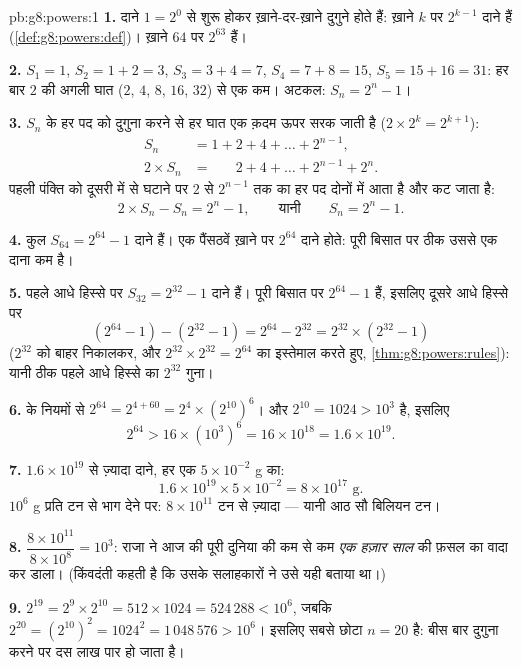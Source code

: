 \begin{solution}{pb:g8:powers:1}
\textbf{1.} दाने $1 = 2^0$ से शुरू होकर ख़ाने-दर-ख़ाने दुगुने होते
हैं: ख़ाने $k$ पर $2^{k-1}$ दाने हैं
(\cref{def:g8:powers:def})। ख़ाने $64$ पर $2^{63}$ हैं।

\textbf{2.} $S_1 = 1$, $S_2 = 1 + 2 = 3$, $S_3 = 3 + 4 = 7$,
$S_4 = 7 + 8 = 15$, $S_5 = 15 + 16 = 31$: हर बार $2$ की अगली घात
($2$, $4$, $8$, $16$, $32$) से एक कम। अटकल:
$S_n = 2^n - 1$।

\textbf{3.} $S_n$ के हर पद को दुगुना करने से हर घात एक क़दम ऊपर
सरक जाती है ($2 \times 2^{k} = 2^{k+1}$):
\begin{align*}
S_n &= 1 + 2 + 4 + \dots + 2^{n-1}, \\
2 \times S_n &= \phantom{1 + {}} 2 + 4 + \dots + 2^{n-1} + 2^n .
\end{align*}
पहली पंक्ति को दूसरी में से घटाने पर $2$ से $2^{n-1}$ तक का हर पद
दोनों में आता है और कट जाता है:
\[
2 \times S_n - S_n = 2^n - 1,
\qquad\text{यानी}\qquad
S_n = 2^n - 1 .
\]

\textbf{4.} कुल $S_{64} = 2^{64} - 1$ दाने हैं। एक पैंसठवें ख़ाने
पर $2^{64}$ दाने होते: पूरी बिसात पर ठीक उससे एक दाना कम है।

\textbf{5.} पहले आधे हिस्से पर $S_{32} = 2^{32} - 1$ दाने हैं।
पूरी बिसात पर $2^{64} - 1$ हैं, इसलिए दूसरे आधे हिस्से पर
\[
\left(2^{64} - 1\right) - \left(2^{32} - 1\right)
= 2^{64} - 2^{32}
= 2^{32} \times \left(2^{32} - 1\right)
\]
($2^{32}$ को बाहर निकालकर, और $2^{32} \times 2^{32} = 2^{64}$ का
इस्तेमाल करते हुए, \cref{thm:g8:powers:rules}): यानी ठीक पहले आधे
हिस्से का $2^{32}$ गुना।

\textbf{6.}  के नियमों से $2^{64} = 2^{4 + 60} =
2^4 \times \left(2^{10}\right)^6$। और $2^{10} = 1024 > 10^3$ है,
इसलिए
\[
2^{64} > 16 \times \left(10^3\right)^6 = 16 \times 10^{18}
= 1.6 \times 10^{19} .
\]

\textbf{7.} $1.6 \times 10^{19}$ से ज़्यादा दाने, हर एक
$5 \times 10^{-2}$ g का:
\[
1.6 \times 10^{19} \times 5 \times 10^{-2}
= 8 \times 10^{17} \text{ g} .
\]
$10^6$ g प्रति टन से भाग देने पर: $8 \times 10^{11}$ टन से ज़्यादा
--- यानी आठ सौ बिलियन टन।

\textbf{8.} $\dfrac{8 \times 10^{11}}{8 \times 10^{8}} = 10^3$:
राजा ने आज की पूरी दुनिया की कम से कम \emph{एक हज़ार साल} की फ़सल
का वादा कर डाला। (किंवदंती कहती है कि उसके सलाहकारों ने उसे यही
बताया था।)

\textbf{9.} $2^{19} = 2^9 \times 2^{10} = 512 \times 1024 =
524\,288 < 10^6$, जबकि $2^{20} = \left(2^{10}\right)^2 =
1024^2 = 1\,048\,576 > 10^6$। इसलिए सबसे छोटा  $n = 20$ है:
बीस बार दुगुना करने पर दस लाख पार हो जाता है।


\end{solution}
